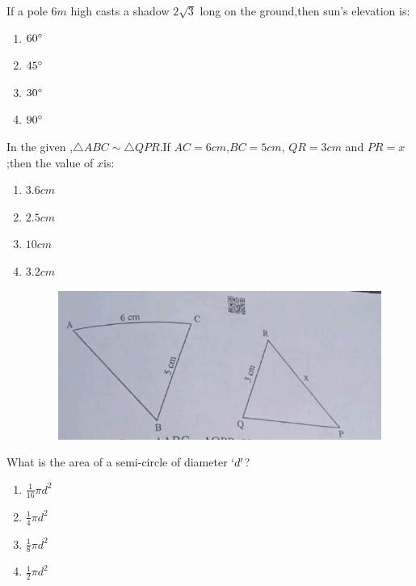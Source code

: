 %
    \item  If a pole $6 m$ high casts a shadow $2\sqrt{3}$  long on the ground,then sun's elevation is:
    \begin{enumerate}[label=(\alph*)]
        \item  $60\degree$
        \item  $45\degree$
        \item  $30\degree$
        \item  $90\degree$
    \end{enumerate}
    \item  In the given ,$\triangle ABC \sim  \triangle QPR$.If $AC= 6 cm$,$BC = 5 cm$, $QR = 3 cm$ and $PR=x$;then the value of $x$is:
        \begin{enumerate}[label=(\alph*)]
            \item  $3.6 cm$
            \item  $2.5 cm$
            \item  $10 cm$
            \item  $3.2 cm$
               \begin{figure}[H]
  \centering
  \includegraphics[width=\columnwidth]{figs/triangles.jpeg}
  \caption{}
  \label{fig:figure2}
\end{figure}
        \end{enumerate}
        \pagebreak
    \item  What is the area of a semi-circle of diameter $\lq d \rq$?
    \begin{enumerate}[label=(\alph*)]
        \item  $\frac{1}{16}\pi d^2$
        \item  $\frac{1}{4} \pi d^2$
        \item  $\frac{1}{8}\pi d^2$
        \item  $\frac{1}{2}\pi d^2$
    \end{enumerate}
